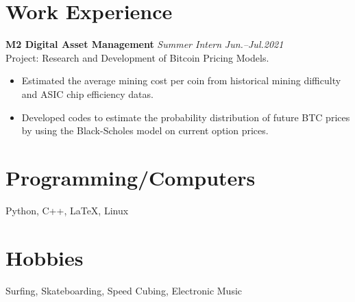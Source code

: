 \documentclass[11pt,a4paper,roman]{moderncv}        %
\begin{document}
\section{Work Experience}

\textbf{M2 Digital Asset Management} \textit{Summer Intern} \hfill \textit{Jun.--Jul.2021}
\vspace*{1mm}\\
{Project: Research and Development of Bitcoin Pricing Models.}
\vspace*{1mm}
\begin{itemize}
	\item Estimated the average mining cost per coin from historical mining difficulty and ASIC chip efficiency datas.
	\item Developed codes to estimate the probability distribution of future BTC prices by using the Black-Scholes model on current option prices.
\end{itemize}

\section{Programming/Computers}
{Python, C++, \LaTeX, Linux}

\section{Hobbies}
{Surfing, Skateboarding, Speed Cubing, Electronic Music}
\end{document}

